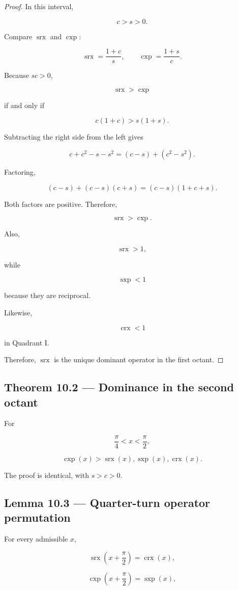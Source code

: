 \documentclass[11pt,oneside,openany]{book}
\newcommand{\PCsubsection}[1]{%
  \subsection*{#1}%
}
\begin{document}
\begin{proof}
In this interval,

\[
c>s>0.
\]

Compare \(\operatorname{srx}\) and \(\operatorname{cxp}\):

\[
\operatorname{srx} = \frac{1+c}{s}, \qquad \operatorname{cxp} = \frac{1+s}{c}.
\]

Because \(sc>0\),

\[
\operatorname{srx}>\operatorname{cxp}
\]

if and only if

\[
c(1+c)>s(1+s).
\]

Subtracting the right side from the left gives

\[
c+c^2-s-s^2 = (c-s)+(c^2-s^2).
\]

Factoring,

\[
(c-s)+(c-s)(c+s) = (c-s)(1+c+s).
\]

Both factors are positive. Therefore,

\[
\operatorname{srx}>\operatorname{cxp}.
\]

Also,

\[
\operatorname{srx}>1,
\]

while

\[
\operatorname{sxp}<1
\]

because they are reciprocal.

Likewise,

\[
\operatorname{crx}<1
\]

in Quadrant I.

Therefore, \(\operatorname{srx}\) is the unique dominant operator in the first octant.

\end{proof}

\PCsubsection{Theorem 10.2 --- Dominance in the second octant}

For

\[
\frac{\pi}{4}<x<\frac{\pi}{2},
\]

\[
\boxed{ \operatorname{cxp}(x) > \operatorname{srx}(x), \operatorname{sxp}(x), \operatorname{crx}(x) }.
\]

The proof is identical, with \(s>c>0\).

\PCsubsection{Lemma 10.3 --- Quarter-turn operator permutation}

For every admissible \(x\),

\[
\operatorname{srx}\left(x+\frac{\pi}{2}\right) = \operatorname{crx}(x),
\]

\[
\operatorname{cxp}\left(x+\frac{\pi}{2}\right) = \operatorname{sxp}(x),
\]
\end{document}
